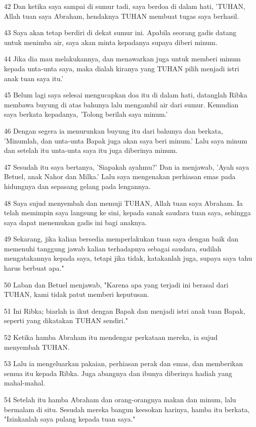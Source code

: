 \par 42 Dan ketika saya sampai di sumur tadi, saya berdoa di dalam hati, 'TUHAN, Allah tuan saya Abraham, hendaknya TUHAN membuat tugas saya berhasil.
\par 43 Saya akan tetap berdiri di dekat sumur ini. Apabila seorang gadis datang untuk menimba air, saya akan minta kepadanya supaya diberi minum.
\par 44 Jika dia mau melakukannya, dan menawarkan juga untuk memberi minum kepada unta-unta saya, maka dialah kiranya yang TUHAN pilih menjadi istri anak tuan saya itu.'
\par 45 Belum lagi saya selesai mengucapkan doa itu di dalam hati, datanglah Ribka membawa buyung di atas bahunya lalu mengambil air dari sumur. Kemudian saya berkata kepadanya, 'Tolong berilah saya minum.'
\par 46 Dengan segera ia menurunkan buyung itu dari bahunya dan berkata, 'Minumlah, dan unta-unta Bapak juga akan saya beri minum.' Lalu saya minum dan setelah itu unta-unta saya itu juga diberinya minum.
\par 47 Sesudah itu saya bertanya, 'Siapakah ayahmu?' Dan ia menjawab, 'Ayah saya Betuel, anak Nahor dan Milka.' Lalu saya mengenakan perhiasan emas pada hidungnya dan sepasang gelang pada lengannya.
\par 48 Saya sujud menyembah dan memuji TUHAN, Allah tuan saya Abraham. Ia telah memimpin saya langsung ke sini, kepada sanak saudara tuan saya, sehingga saya dapat menemukan gadis ini bagi anaknya.
\par 49 Sekarang, jika kalian bersedia memperlakukan tuan saya dengan baik dan memenuhi tanggung jawab kalian terhadapnya sebagai saudara, sudilah mengatakannya kepada saya, tetapi jika tidak, katakanlah juga, supaya saya tahu harus berbuat apa."
\par 50 Laban dan Betuel menjawab, "Karena apa yang terjadi ini berasal dari TUHAN, kami tidak patut memberi keputusan.
\par 51 Ini Ribka; biarlah ia ikut dengan Bapak dan menjadi istri anak tuan Bapak, seperti yang dikatakan TUHAN sendiri."
\par 52 Ketika hamba Abraham itu mendengar perkataan mereka, ia sujud menyembah TUHAN.
\par 53 Lalu ia mengeluarkan pakaian, perhiasan perak dan emas, dan memberikan semua itu kepada Ribka. Juga abangnya dan ibunya diberinya hadiah yang mahal-mahal.
\par 54 Setelah itu hamba Abraham dan orang-orangnya makan dan minum, lalu bermalam di situ. Sesudah mereka bangun keesokan harinya, hamba itu berkata, "Izinkanlah saya pulang kepada tuan saya."
